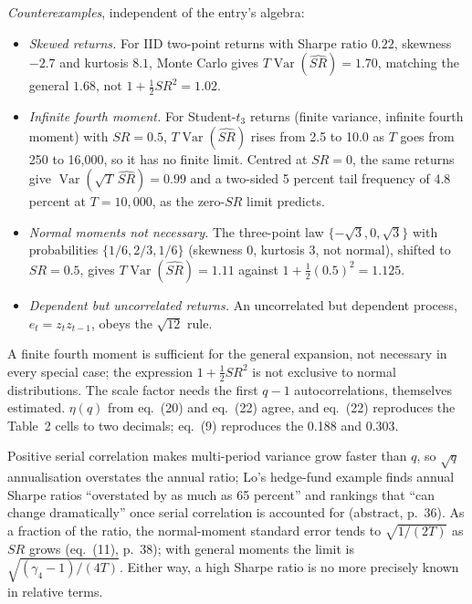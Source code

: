 \begin{qfmethod}
\emph{Counterexamples}, independent of the entry's algebra:
\begin{itemize}
\item \emph{Skewed returns.} For IID two-point returns with Sharpe ratio $0.22$, skewness $-2.7$ and kurtosis $8.1$, Monte Carlo gives $T\operatorname{Var}(\widehat{SR})=1.70$, matching the general $1.68$, not $1+\tfrac12SR^2=1.02$.
\item \emph{Infinite fourth moment.} For Student-$t_3$ returns (finite variance, infinite fourth moment) with $SR=0.5$, $T\operatorname{Var}(\widehat{SR})$ rises from 2.5 to 10.0 as $T$ goes from 250 to 16{,}000, so it has no finite limit. Centred at $SR=0$, the same returns give $\operatorname{Var}(\sqrt T\,\widehat{SR})=0.99$ and a two-sided 5 percent tail frequency of 4.8 percent at $T=10{,}000$, as the zero-$SR$ limit predicts.
\item \emph{Normal moments not necessary.} The three-point law $\{-\sqrt3,0,\sqrt3\}$ with probabilities $\{1/6,2/3,1/6\}$ (skewness 0, kurtosis 3, not normal), shifted to $SR=0.5$, gives $T\operatorname{Var}(\widehat{SR})=1.11$ against $1+\tfrac12(0.5)^2=1.125$.
\item \emph{Dependent but uncorrelated returns.} An uncorrelated but dependent process, $e_t=z_tz_{t-1}$, obeys the $\sqrt{12}$ rule.
\end{itemize}
A finite fourth moment is sufficient for the general expansion, not necessary in every special case; the expression $1+\tfrac12SR^2$ is not exclusive to normal distributions. The scale factor needs the first $q-1$ autocorrelations, themselves estimated. $\eta(q)$ from eq.~(20) and eq.~(22) agree, and eq.~(22) reproduces the Table~2 cells to two decimals; eq.~(9) reproduces the 0.188 and 0.303.

 Positive serial correlation makes multi-period variance grow faster than $q$, so $\sqrt{q}$ annualisation overstates the annual ratio; Lo's hedge-fund example finds annual Sharpe ratios ``overstated by as much as 65 percent'' and rankings that ``can change dramatically'' once serial correlation is accounted for (abstract, p.~36). As a fraction of the ratio, the normal-moment standard error tends to $\sqrt{1/(2T)}$ as $SR$ grows (eq.~(11), p.~38); with general moments the limit is $\sqrt{(\gamma_4-1)/(4T)}$. Either way, a high Sharpe ratio is no more precisely known in relative terms.


\end{qfmethod}
